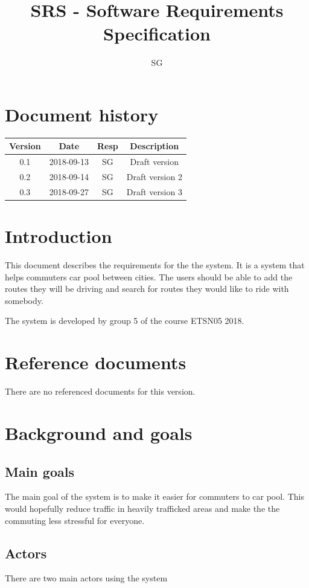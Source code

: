 \documentclass{article}
\title{SRS - Software Requirements Specification}
\begin{document}
\author{SG}

\maketitle
\thispagestyle{fancy}
\tableofcontents
\newpage

\section*{Document history}
 \begin{tabular}{||c c c c||} 
 \hline
 Version & Date & Resp & Description \\ [0.5ex] 
 \hline\hline
 0.1 & 2018-09-13 & SG & Draft version \\ 
 0.2 & 2018-09-14 & SG & Draft version 2 \\
 0.3 & 2018-09-27 & SG & Draft version 3 \\
 \hline
 

\end{tabular}

\section{Introduction}
This document describes the requirements for the the system. It is a system that helps commuters car pool between cities. The users should be able to add the routes they will be driving and search for routes they would like to ride with somebody.

The system is developed by group 5 of the course ETSN05 2018.

\section{Reference documents}
There are no referenced documents for this version.
\section{Background and goals}

\subsection{Main goals}
The main goal of the system is to make it easier for commuters to car pool. This would hopefully reduce traffic in heavily trafficked areas and make the the commuting less stressful for everyone.  
\subsection{Actors}
There are two main actors using the system
\end{document}

